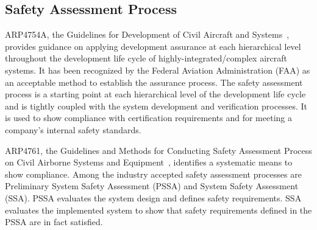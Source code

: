 \subsection{Safety Assessment Process}
\label{subsec:process}

ARP4754A, the Guidelines for Development of Civil Aircraft and Systems~\cite{SAE:ARP4754A}, provides guidance on applying development assurance at each hierarchical level throughout the development life cycle of highly-integrated/complex aircraft systems. It has been recognized by the Federal Aviation Administration (FAA) as an acceptable method to establish the assurance process. The safety assessment process is a starting point at each hierarchical level of the development life cycle and is tightly coupled with the system development and verification processes. It is used to show compliance with certification requirements and for meeting a company's internal safety standards. 

ARP4761, the Guidelines and Methods for Conducting Safety Assessment Process on Civil Airborne Systems and Equipment~\cite{SAE:ARP4761},  identifies a systematic means to show compliance. Among the industry accepted safety assessment processes are Preliminary System Safety Assessment (PSSA) and System Safety Assessment (SSA). PSSA evaluates the system design and defines safety requirements. SSA evaluates the implemented system to show that safety requirements defined in the PSSA are in fact satisfied.

